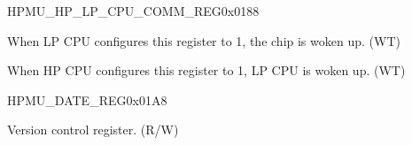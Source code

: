 \begin{register}{H}{PMU\_HP\_LP\_CPU\_COMM\_REG}{0x0188}\label{regdesc:PMUHPLPCPUCOMMREG}
%
%
%
\regnewline%
\begin{regdesc}\begin{reglist}
\label{fielddesc:PMULPTRIGGERHP}\item [PMU\_LP\_TRIGGER\_HP] When LP CPU configures this register to 1, the chip is woken up. (WT)
\label{fielddesc:PMUHPTRIGGERLP}\item [PMU\_HP\_TRIGGER\_LP] When HP CPU configures this register to 1, LP CPU is woken up. (WT)
\end{reglist}\end{regdesc}
\end{register}

\begin{register}{H}{PMU\_DATE\_REG}{0x01A8}\label{regdesc:PMUDATEREG}
%
%
\regnewline%
\begin{regdesc}\begin{reglist}
\label{fielddesc:PMUPMUDATE}\item [PMU\_PMU\_DATE] Version control register. (R/W)
\end{reglist}\end{regdesc}
\end{register}
